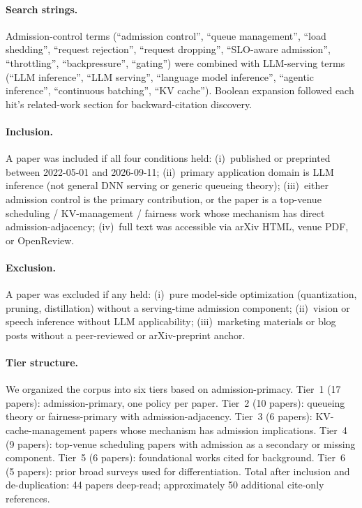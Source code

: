 \documentclass[11pt,letterpaper]{article}
\theoremstyle{definition}
\begin{document}
\paragraph{Search strings.} Admission-control terms (``admission
control'', ``queue management'', ``load shedding'', ``request
rejection'', ``request dropping'', ``SLO-aware admission'',
``throttling'', ``backpressure'', ``gating'') were combined with
LLM-serving terms (``LLM inference'', ``LLM serving'', ``language
model inference'', ``agentic inference'', ``continuous batching'',
``KV cache''). Boolean expansion followed each hit's related-work
section for backward-citation discovery.

\paragraph{Inclusion.} A paper was included if all four conditions
held: (i)~published or preprinted between 2022-05-01 and 2026-09-11;
(ii)~primary application domain is LLM inference (not general DNN
serving or generic queueing theory); (iii)~either admission control is
the primary contribution, or the paper is a top-venue scheduling /
KV-management / fairness work whose mechanism has direct
admission-adjacency; (iv)~full text was accessible via arXiv HTML,
venue PDF, or OpenReview.

\paragraph{Exclusion.} A paper was excluded if any held: (i)~pure
model-side optimization (quantization, pruning, distillation) without
a serving-time admission component; (ii)~vision or speech inference
without LLM applicability; (iii)~marketing materials or blog posts
without a peer-reviewed or arXiv-preprint anchor.

\paragraph{Tier structure.} We organized the corpus into six tiers
based on admission-primacy. Tier~1 (17 papers): admission-primary,
one policy per paper. Tier~2 (10 papers): queueing theory or
fairness-primary with admission-adjacency. Tier~3 (6 papers):
KV-cache-management papers whose mechanism has admission
implications. Tier~4 (9 papers): top-venue scheduling papers with
admission as a secondary or missing component. Tier~5 (6 papers):
foundational works cited for background. Tier~6 (5 papers): prior
broad surveys used for differentiation. Total after inclusion and
de-duplication: 44 papers deep-read; approximately 50 additional
cite-only references.
\end{document}
